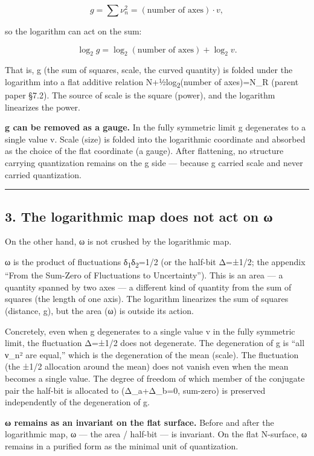 \documentclass[11pt]{ltjsarticle}
\begin{document}
\[g = \sum\nu_n^2 = (\text{number of axes})\cdot v,\]

so the logarithm can act on the sum:

\[\log_2 g = \log_2(\text{number of axes}) + \log_2 v.\]

That is, g (the sum of squares, scale, the curved quantity) is folded
under the logarithm into a flat additive relation N+½log\textsubscript{2}(number of
axes)=N\_R (parent paper §7.2). The source of scale is the square
(power), and the logarithm linearizes the power.

\textbf{g can be removed as a gauge.} In the fully symmetric limit g
degenerates to a single value v. Scale (size) is folded into the
logarithmic coordinate and absorbed as the choice of the flat coordinate
(a gauge). After flattening, no structure carrying quantization remains
on the g side --- because g carried scale and never carried
quantization.

\begin{center}\rule{0.5\linewidth}{0.5pt}\end{center}

\subsection{3. The logarithmic map does not act on
ω}\label{the-logarithmic-map-does-not-act-on-ux3c9}

On the other hand, ω is not crushed by the logarithmic map.

ω is the product of fluctuations δ\textsubscript{1}δ\textsubscript{2}=1/2 (or the half-bit Δ=±1/2; the
appendix ``From the Sum-Zero of Fluctuations to Uncertainty''). This is
an area --- a quantity spanned by two axes --- a different kind of
quantity from the sum of squares (the length of one axis). The logarithm
linearizes the sum of squares (distance, g), but the area (ω) is outside
its action.

Concretely, even when g degenerates to a single value v in the fully
symmetric limit, the fluctuation Δ=±1/2 does not degenerate. The
degeneration of g is ``all ν\_n² are equal,'' which is the degeneration
of the mean (scale). The fluctuation (the ±1/2 allocation around the
mean) does not vanish even when the mean becomes a single value. The
degree of freedom of which member of the conjugate pair the half-bit is
allocated to (Δ\_a+Δ\_b=0, sum-zero) is preserved independently of the
degeneration of g.

\textbf{ω remains as an invariant on the flat surface.} Before and after
the logarithmic map, ω --- the area / half-bit --- is invariant. On the
flat N-surface, ω remains in a purified form as the minimal unit of
quantization.
\end{document}
